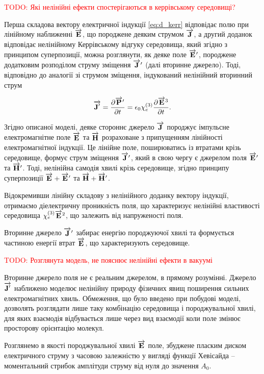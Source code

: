 \textcolor{red}{TODO: Які нелінійні ефекти спостерігаються в 
керрівському середовищі?}

Перша складова вектору електричної індукції \eqref{eq:d_kerr} відповідає 
полю при лінійному наближенні $ \overrightarrow{\mathbf E} $, що породжене деяким 
струмом $ \overrightarrow{\mathbf J} $, а другий доданок відповідає нелінійному Керрівському 
відгуку середовища, який згідно з принципом суперпозиції, можна розглянути, 
як деяке поле $ \overrightarrow{\mathbf E}^\prime $, породжене додатковим розподілом струму 
зміщення $ \overrightarrow{\mathbf J}^\prime $ (далі вторинне джерело). Тоді, відповідно до
аналогії зі струмом зміщення, індукований нелінійний вторинний струм

\begin{equation} \label{eq:j_kerr}
\overrightarrow{\mathbf J^\prime} = \frac{\partial \overrightarrow{\mathbf P}^\prime}{\partial t} = 
\epsilon_0 \chi_e^{(3)} \frac{\partial \overrightarrow{\mathbf E}^3}{\partial t}.
\end{equation}

Згідно описаної моделі, деяке стороннє джерело $ \overrightarrow{\mathbf J} $ породжує 
імпульсне електромагнітне поле $ \overrightarrow{\mathbf E} $ та $ \overrightarrow{\mathbf H} $ розраховане
з припущенням лінійності електромагнітної індукції. Це лінійне поле, 
поширюватись із втратами крізь середовище, формує струм зміщення 
$ \overrightarrow{\mathbf J}^\prime $, який в свою чергу є джерелом поля $ \overrightarrow{\mathbf E}^\prime $ 
та $ \overrightarrow{\mathbf H}^\prime $. Тоді, нелінійна самодія хвилі крізь середовище, 
згідно принципу суперпозиції $ \overrightarrow{\mathbf E} + \overrightarrow{\mathbf E}^\prime $ та 
$ \overrightarrow{\mathbf H} + \overrightarrow{\mathbf H}^\prime $.

Відокремивши лінійну складову з нелінійного доданку вектору індукції, 
отримаємо діелектричну проникність поля, що характеризує нелінійні 
властивості середовища $ \chi_e^{(3)} \overrightarrow{\mathbf E}^2 $, що залежить від 
напруженості поля.

Вторинне джерело $ \overrightarrow{\mathbf J}^\prime $ забирає енергію породжуючої хвилі та 
формується частиною енергії втрат $ \overrightarrow{\mathbf E} $, що характеризують середовище.

\textcolor{red}{TODO: Розглянута модель, не пояснює нелінійні ефекти в вакуумі}

Вторинне джерело поля не є реальним джерелом, в прямому розумінні. 
Джерело $ \overrightarrow{\mathbf J^\prime} $ наближено моделює нелінійну природу фізичних 
явищ поширення сильних електромагнітних хвиль. Обмеження, що було 
введено при побудові моделі, дозволять розглядати лише таку комбінацію 
середовища і породжувальної хвилі, для яких взаємодія відбувається лише
через вид взаємодії коли поле змінює просторову орієнтацію молекул.

Розглянемо в якості породжувальної хвилі $ \overrightarrow{\mathbf E} $ поле, збуджене 
пласким диском електричного струму з часовою залежністю у вигляді 
функції Хевісайда -- моментальний стрибок амплітуди струму від нуля до 
значення $ A_0 $.

